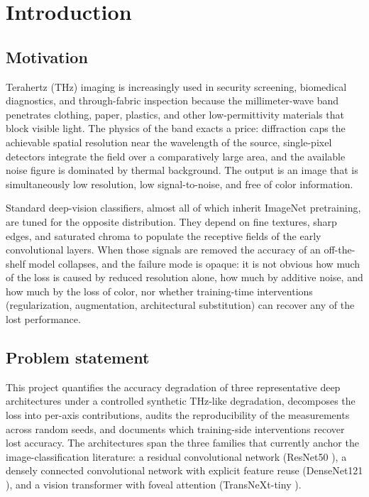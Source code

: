\section{Introduction}
\label{sec:intro}

\subsection{Motivation}
Terahertz (THz) imaging is increasingly used in security screening, biomedical
diagnostics, and through-fabric inspection because the millimeter-wave band
penetrates clothing, paper, plastics, and other low-permittivity materials
that block visible light. The physics of the band exacts a price: diffraction
caps the achievable spatial resolution near the wavelength of the source,
single-pixel detectors integrate the field over a comparatively large area,
and the available noise figure is dominated by thermal background. The output
is an image that is simultaneously low resolution, low signal-to-noise, and
free of color information.

Standard deep-vision classifiers, almost all of which inherit ImageNet
pretraining, are tuned for the opposite distribution. They depend on fine
textures, sharp edges, and saturated chroma to populate the receptive fields
of the early convolutional layers. When those signals are removed the accuracy
of an off-the-shelf model collapses, and the failure mode is opaque: it is
not obvious how much of the loss is caused by reduced resolution alone, how
much by additive noise, and how much by the loss of color, nor whether
training-time interventions (regularization, augmentation, architectural
substitution) can recover any of the lost performance.

\subsection{Problem statement}
This project quantifies the accuracy degradation of three representative deep
architectures under a controlled synthetic THz-like degradation, decomposes
the loss into per-axis contributions, audits the reproducibility of the
measurements across random seeds, and documents which training-side
interventions recover lost accuracy. The architectures span the three families
that currently anchor the image-classification literature: a residual
convolutional network (ResNet50 \cite{he2016resnet}), a densely connected
convolutional network with explicit feature reuse (DenseNet121
\cite{huang2017densenet}), and a vision transformer with foveal attention
(TransNeXt-tiny \cite{shi2024transnext}).

